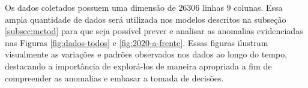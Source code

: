 Os dados coletados possuem uma dimensão de $26306$ linhas  $9$ colunas. Essa ampla quantidade de dados será utilizada nos modelos descritos na subseção \ref{subsec:metod} para que seja possível prever e analisar as anomalias evidenciadas nas Figuras \ref{fig:dados-todos} e \ref{fig:2020-a-frente}. Essas figuras ilustram visualmente as variações e padrões observados nos dados ao longo do tempo, destacando a importância de explorá-los de maneira apropriada a fim de compreender as anomalias e embasar a tomada de decisões.






